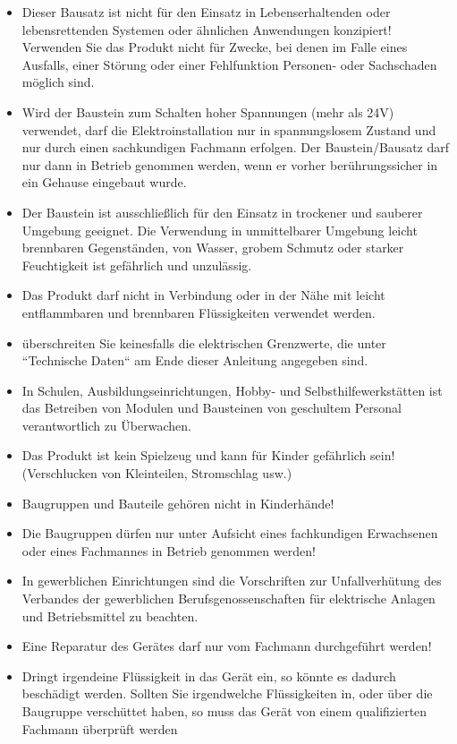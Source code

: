 \documentclass[fleqn,10pt]{SelfArx} %
\begin{document}
\begin{itemize}[noitemsep] %
\item Dieser Bausatz ist nicht für den Einsatz in Lebenserhaltenden oder lebensrettenden Systemen oder ähnlichen Anwendungen konzipiert! Verwenden Sie das Produkt nicht für Zwecke, bei denen im Falle eines Ausfalls, einer Störung oder einer Fehlfunktion Personen- oder Sachschaden möglich sind.
\item Wird der Baustein zum Schalten hoher Spannungen (mehr als 24V) verwendet, darf die Elektroinstallation nur in spannungslosem Zustand
und nur durch einen sachkundigen Fachmann erfolgen. Der Baustein/Bausatz darf nur dann in Betrieb genommen werden, wenn er vorher berührungssicher in ein Gehause eingebaut wurde.
\item Der Baustein ist ausschließlich für den Einsatz in trockener und sauberer Umgebung geeignet. Die Verwendung in unmittelbarer Umgebung leicht brennbaren Gegenständen, von Wasser, grobem Schmutz oder starker Feuchtigkeit ist gefährlich und unzulässig.
\item Das Produkt darf nicht in Verbindung oder in der Nähe mit leicht entflammbaren und brennbaren Flüssigkeiten verwendet werden.
\item überschreiten Sie keinesfalls die elektrischen Grenzwerte, die unter “Technische Daten“ am Ende dieser Anleitung angegeben sind.
\item In Schulen, Ausbildungseinrichtungen, Hobby- und Selbsthilfewerkstätten ist das Betreiben von Modulen und Bausteinen von geschultem Personal verantwortlich zu Überwachen.
\item Das Produkt ist kein Spielzeug und kann für Kinder gefährlich sein! (Verschlucken von Kleinteilen, Stromschlag usw.)
\item Baugruppen und Bauteile gehören nicht in Kinderhände!
\item Die Baugruppen dürfen nur unter Aufsicht eines fachkundigen Erwachsenen oder eines Fachmannes in Betrieb genommen werden!
\item In gewerblichen Einrichtungen sind die Vorschriften zur Unfallverhütung des Verbandes der gewerblichen Berufsgenossenschaften für elektrische Anlagen und Betriebsmittel zu beachten.
\item Eine Reparatur des Gerätes darf nur vom Fachmann durchgeführt werden!
\item Dringt irgendeine Flüssigkeit in das Gerät ein, so könnte es dadurch beschädigt werden. Sollten Sie irgendwelche Flüssigkeiten in, oder über die Baugruppe verschüttet haben, so muss das Gerät von einem qualifizierten Fachmann überprüft werden

\end{itemize}
\end{document}
